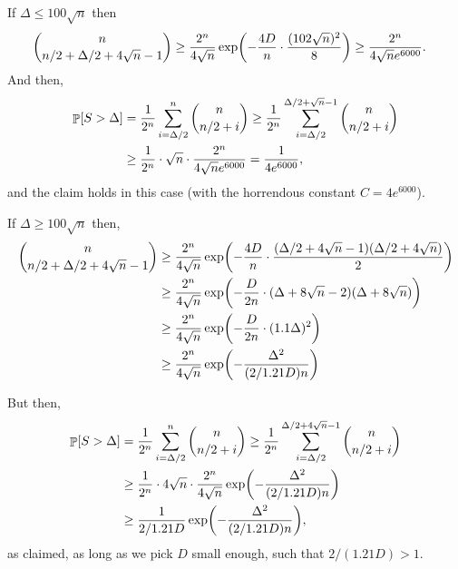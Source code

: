 {{      If $\Delta \leq 100\sqrt{n}$ then
      \begin{align*}
          \binom{n}{n/2 + \Delta/2 + 4\sqrt{n} - 1} &\geq
          \frac{2^n}{4\sqrt{n}} \exp \pth{ - \frac{4D}{n} \cdot
             \frac{(102\sqrt{n} )^2}{8} } \geq \frac{2^n}{4\sqrt{n}
             e^{6000}}.
      \end{align*}
      And then,
      \begin{align*}
          \Prob{S > \Delta}%
          &=%
          \frac{1}{2^n}\sum_{i=\Delta/2}^n \binom{n}{n/2 + i} \geq
          \frac{1}{2^n}\sum_{i=\Delta/2}^{\Delta/2+\sqrt{n} -1}
          \binom{n}{n/2 + i}%
          \\&%
          \geq%
          \frac{1}{2^n} \cdot \sqrt{n} \cdot \frac{2^n}{4\sqrt{n}
             e^{6000}} = \frac{1}{4e^{6000}},
      \end{align*}
      and the claim holds in this case (with the horrendous constant
      $C = 4e^{6000}$).

      If $\Delta \geq 100\sqrt{n}$ then,
      \begin{align*}
          \binom{n}{n/2 + \Delta/2 + 4\sqrt{n} - 1} &\geq%
          \frac{2^n}{4\sqrt{n}} \exp \pth{ - \frac{4D}{n} \cdot
             \frac{(\Delta/2 + 4\sqrt{n}
                -1)(\Delta/2 + 4 \sqrt{n})}{2} }\\
          &\geq%
          \frac{2^n}{4\sqrt{n}} \exp \pth{ - \frac{D}{2n} \cdot
             (\Delta + 8\sqrt{n}
             -2)(\Delta + 8 \sqrt{n}) }\\
          &\geq%
          \frac{2^n}{4\sqrt{n}} \exp \pth{ -
             \frac{D}{2n} \cdot (1.1\Delta)^2 }\\
          &\geq%
          \frac{2^n}{4\sqrt{n}} \exp \pth{ -
             \frac{\Delta^2}{(2/1.21D)n} }\\
      \end{align*}

      But then,
      \begin{align*}
          \Prob{S > \Delta}%
          &=%
          \frac{1}{2^n}\sum_{i=\Delta/2}^n \binom{n}{n/2 + i} \geq
          \frac{1}{2^n}\sum_{i=\Delta/2}^{\Delta/2+4\sqrt{n} -1}
          \binom{n}{n/2
             + i} \\
          &\geq%
          \frac{1}{2^n} \cdot 4 \sqrt{n} \cdot \frac{2^n}{4\sqrt{n}}
          \exp \pth{ -
             \frac{\Delta^2}{(2/1.21D)n} }\\
          &\geq \frac{1}{2/1.21D} \exp \pth{ -
             \frac{\Delta^2}{(2/1.21D)n} },
      \end{align*}
      as claimed, as long as we pick $D$ small enough, such that
      $2/(1.21D) > 1$.%
   }%
}

